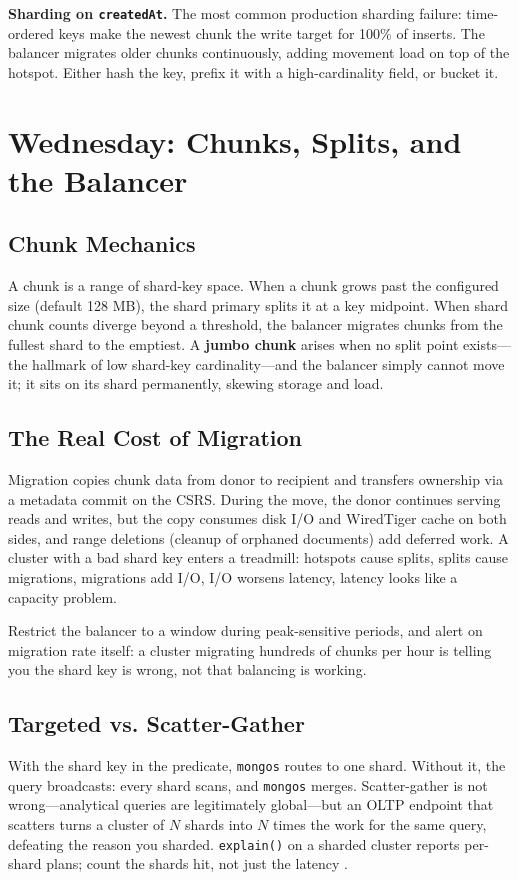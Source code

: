\begin{pitfall}
\textbf{Sharding on \texttt{createdAt}.} The most common production sharding failure: time-ordered keys make the newest chunk the write target for 100\% of inserts. The balancer migrates older chunks continuously, adding movement load on top of the hotspot. Either hash the key, prefix it with a high-cardinality field, or bucket it.
\end{pitfall}

\section{Wednesday: Chunks, Splits, and the Balancer}
\subsection{Chunk Mechanics}
A chunk is a range of shard-key space. When a chunk grows past the configured size (default 128 MB), the shard primary splits it at a key midpoint. When shard chunk counts diverge beyond a threshold, the balancer migrates chunks from the fullest shard to the emptiest. A \textbf{jumbo chunk} arises when no split point exists---the hallmark of low shard-key cardinality---and the balancer simply cannot move it; it sits on its shard permanently, skewing storage and load.

\subsection{The Real Cost of Migration}
Migration copies chunk data from donor to recipient and transfers ownership via a metadata commit on the CSRS. During the move, the donor continues serving reads and writes, but the copy consumes disk I/O and WiredTiger cache on both sides, and range deletions (cleanup of orphaned documents) add deferred work. A cluster with a bad shard key enters a treadmill: hotspots cause splits, splits cause migrations, migrations add I/O, I/O worsens latency, latency looks like a capacity problem.

\begin{tipbox}
Restrict the balancer to a window during peak-sensitive periods, and alert on migration rate itself: a cluster migrating hundreds of chunks per hour is telling you the shard key is wrong, not that balancing is working.
\end{tipbox}

\subsection{Targeted vs. Scatter-Gather}
With the shard key in the predicate, \texttt{mongos} routes to one shard. Without it, the query broadcasts: every shard scans, and \texttt{mongos} merges. Scatter-gather is not wrong---analytical queries are legitimately global---but an OLTP endpoint that scatters turns a cluster of $N$ shards into $N$ times the work for the same query, defeating the reason you sharded. \texttt{explain()} on a sharded cluster reports per-shard plans; count the shards hit, not just the latency \cite{mongodbExplainDocs}.

